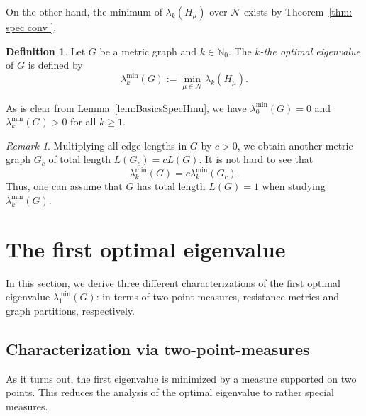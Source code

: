\documentclass[reqno]{amsart}
\theoremstyle{plain}
\theoremstyle{definition}
\newtheorem{defn}[thm]{Definition}
\theoremstyle{remark}
\newtheorem{rmk}[thm]{Remark}
\numberwithin{equation}{section}
\newcommand{\N}{\mathbb{N}}     %
\newcommand{\cN}{\mathcal{N}}
\begin{document}
On the other hand, the minimum of $\lambda_k(H_\mu)$ over $\cN$ exists by Theorem~\ref{thm: spec conv }.
\begin{defn}
	Let $G$ be a metric graph and $k \in \N_{0}$. The \emph{$k$-the optimal eigenvalue} of $G$ is defined by
	\[
	\lambda_k^{\min}(G) := \min_{\mu \in \cN } \lambda_k(H_\mu).
	\]
\end{defn}
As is clear from Lemma~\ref{lem:BasicsSpecHmu}, we have $\lambda_0^{\min}(G) = 0$ and $\lambda_k^{\min}(G) >0$ for all $k \ge 1$.



\begin{rmk} \label{rmk : Scaling property}
	Multiplying all edge lengths in $G$ by $c >0$, we obtain another metric graph $G_c$ of total length $L(G_c) = cL(G)$. It is not hard to see that
	\begin{equation}
		\lambda_k^{\min} (G) = c\lambda_k^{\min}(G_c).
	\end{equation}
	Thus, one can assume that $G$ has total length $L(G)=1$ when studying $ \lambda_k^{\min} (G)$.
\end{rmk}








\section{The first optimal eigenvalue} \label{sec:FirstEigenvalue}

In this section, we derive three different characterizations of the first optimal eigenvalue $\lambda_1^{\min}(G)$: in terms of two-point-measures, resistance metrics and graph partitions, respectively.

\subsection{Characterization via two-point-measures}
As it turns out, the first eigenvalue is minimized by a measure supported on two points. This reduces the analysis of the optimal eigenvalue to rather special measures.
\end{document}
